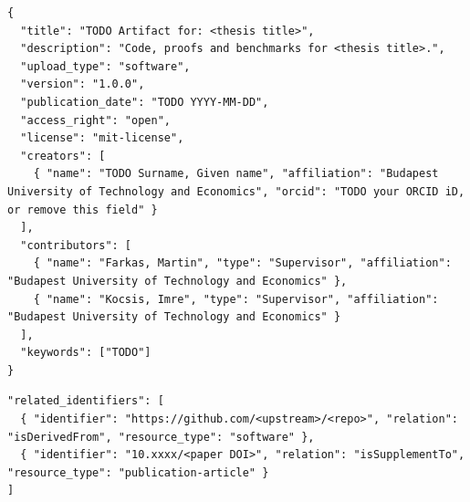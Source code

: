 \begin{listing}[!ht]
\begin{verbatim}
{
  "title": "TODO Artifact for: <thesis title>",
  "description": "Code, proofs and benchmarks for <thesis title>.",
  "upload_type": "software",
  "version": "1.0.0",
  "publication_date": "TODO YYYY-MM-DD",
  "access_right": "open",
  "license": "mit-license",
  "creators": [
    { "name": "TODO Surname, Given name", "affiliation": "Budapest University of Technology and Economics", "orcid": "TODO your ORCID iD, or remove this field" }
  ],
  "contributors": [
    { "name": "Farkas, Martin", "type": "Supervisor", "affiliation": "Budapest University of Technology and Economics" },
    { "name": "Kocsis, Imre", "type": "Supervisor", "affiliation": "Budapest University of Technology and Economics" }
  ],
  "keywords": ["TODO"]
}
\end{verbatim}
\caption{Illustrative record metadata in the file selected by the manifest. Confirm the actual creators, supervisors, license and access; this example is not ready to publish.}\label{guide:lst:zenodo-json}
\end{listing}

\begin{listing}[!ht]
\begin{verbatim}
"related_identifiers": [
  { "identifier": "https://github.com/<upstream>/<repo>", "relation": "isDerivedFrom", "resource_type": "software" },
  { "identifier": "10.xxxx/<paper DOI>", "relation": "isSupplementTo", "resource_type": "publication-article" }
]
\end{verbatim}
\caption{Related works in record metadata. Replace these example identifiers with verified public identifiers, or omit them.}\label{guide:lst:zenodo-related}
\end{listing}

